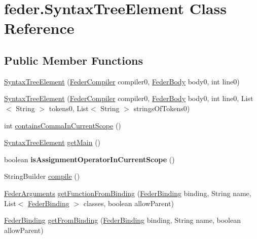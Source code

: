 \hypertarget{classfeder_1_1SyntaxTreeElement}{}\section{feder.\+Syntax\+Tree\+Element Class Reference}
\label{classfeder_1_1SyntaxTreeElement}
\subsection*{Public Member Functions}
\begin{DoxyCompactItemize}
\item 
\hyperlink{classfeder_1_1SyntaxTreeElement_aa18b965a3e3f61eb3084f97958e6475b}{Syntax\+Tree\+Element} (\hyperlink{classfeder_1_1FederCompiler}{Feder\+Compiler} compiler0, \hyperlink{classfeder_1_1types_1_1FederBody}{Feder\+Body} body0, int line0)
\item 
\hyperlink{classfeder_1_1SyntaxTreeElement_a593f70c74e755db21ce8b8a8d96de0e2}{Syntax\+Tree\+Element} (\hyperlink{classfeder_1_1FederCompiler}{Feder\+Compiler} compiler0, \hyperlink{classfeder_1_1types_1_1FederBody}{Feder\+Body} body0, int line0, List$<$ String $>$ tokens0, List$<$ String $>$ strings\+Of\+Tokens0)
\item 
int \hyperlink{classfeder_1_1SyntaxTreeElement_a8b1d25adc7f3172a3901ce8e7bbbe4b4}{contains\+Comma\+In\+Current\+Scope} ()
\item 
\hyperlink{classfeder_1_1SyntaxTreeElement}{Syntax\+Tree\+Element} \hyperlink{classfeder_1_1SyntaxTreeElement_af872b6914a108058f01bbb8bf26a5c51}{get\+Main} ()
\item 
\mbox{\label{classfeder_1_1SyntaxTreeElement_a68fcc8ceece002604df7be1f885ed4ab}} 
boolean {\bfseries is\+Assignment\+Operator\+In\+Current\+Scope} ()
\item 
String\+Builder \hyperlink{classfeder_1_1SyntaxTreeElement_ad0ea3bbe00ba7d3598fce939efef67de}{compile} ()
\item 
\hyperlink{interfacefeder_1_1types_1_1FederArguments}{Feder\+Arguments} \hyperlink{classfeder_1_1SyntaxTreeElement_a7d52c996d50eaa21099e6d745ac3e5ff}{get\+Function\+From\+Binding} (\hyperlink{classfeder_1_1types_1_1FederBinding}{Feder\+Binding} binding, String name, List$<$ \hyperlink{classfeder_1_1types_1_1FederBinding}{Feder\+Binding} $>$ classes, boolean allow\+Parent)
\item 
\hyperlink{classfeder_1_1types_1_1FederBinding}{Feder\+Binding} \hyperlink{classfeder_1_1SyntaxTreeElement_abb5559bc82f686020d3479f9b3fde116}{get\+From\+Binding} (\hyperlink{classfeder_1_1types_1_1FederBinding}{Feder\+Binding} binding, String name, boolean allow\+Parent)

\end{DoxyCompactItemize}
